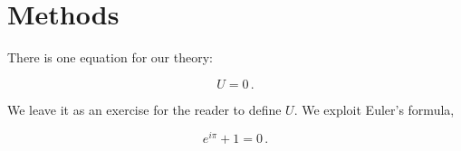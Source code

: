 \section{Methods}
There is one equation for our theory:
\begin{linenomath*}
\begin{equation}\label{E:U}
U = 0 \,.
\end{equation}
\end{linenomath*}
We leave it as an exercise for the reader to define $U$.
We exploit Euler's formula,
\begin{linenomath*}
\begin{equation}\label{E:Euler}
e^{i\pi} + 1 = 0 \,.
\end{equation}
\end{linenomath*}
